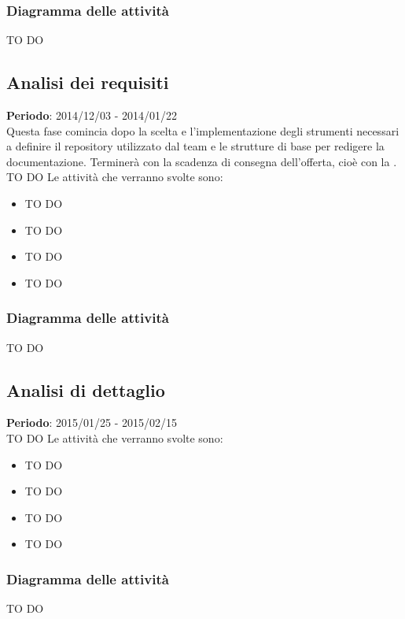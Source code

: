 		\subsubsection{Diagramma delle attività} %
		\label{ssub:diagramma_delle_attivita}
		TO DO
	
	\subsection{Analisi dei requisiti} %
	\label{sub:analisi_dei_requisiti}
	\textbf{Periodo}: 2014/12/03 - 2014/01/22 \\
	Questa fase comincia dopo la scelta e l'implementazione degli strumenti necessari a definire il repository utilizzato dal team e le strutture di base per redigere la documentazione. Terminerà con la scadenza di consegna dell'offerta, cioè con la \RR. \\
	TO DO
	Le attività che verranno svolte sono:
		\begin{itemize}
			\item TO DO
			\item TO DO
			\item TO DO
			\item TO DO
		\end{itemize}
	
		\subsubsection{Diagramma delle attività} %
		\label{ssub:diagramma_delle_attivita}
		TO DO
	
	
	\subsection{Analisi di dettaglio} %
	\label{sub:analisi_di_dettaglio}
	\textbf{Periodo}: 2015/01/25 - 2015/02/15 \\
	TO DO
	Le attività che verranno svolte sono:
		\begin{itemize}
			\item TO DO
			\item TO DO
			\item TO DO
			\item TO DO
		\end{itemize}
	
		\subsubsection{Diagramma delle attività} %
		\label{ssub:diagramma_delle_attivita}
		TO DO
	
